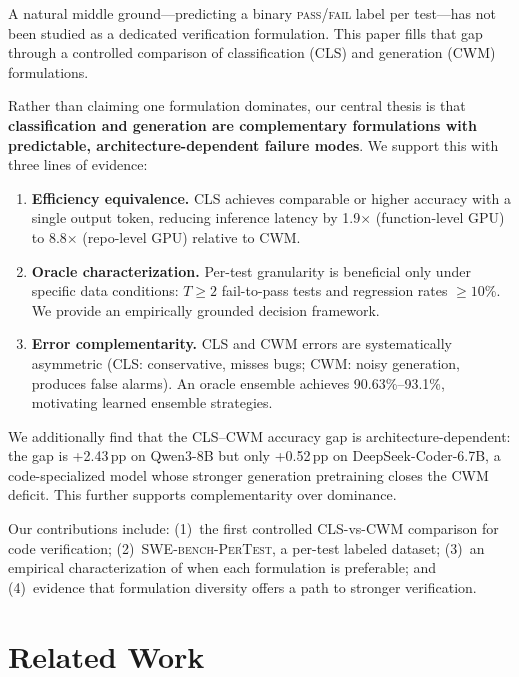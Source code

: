 \documentclass[11pt,a4paper]{article}
\begin{document}
A natural middle ground---predicting a binary \textsc{pass}/\textsc{fail} label per test---has not been studied as a dedicated verification formulation.
This paper fills that gap through a controlled comparison of classification (CLS) and generation (CWM) formulations.

Rather than claiming one formulation dominates, our central thesis is that \textbf{classification and generation are complementary formulations with predictable, architecture-dependent failure modes}.
We support this with three lines of evidence:

\begin{enumerate}
\item \textbf{Efficiency equivalence.}  CLS achieves comparable or higher accuracy with a single output token, reducing inference latency by 1.9$\times$ (function-level GPU) to 8.8$\times$ (repo-level GPU) relative to CWM.

\item \textbf{Oracle characterization.}  Per-test granularity is beneficial only under specific data conditions: $T\!\ge\!2$ fail-to-pass tests and regression rates $\ge\!10$\%.  We provide an empirically grounded decision framework.

\item \textbf{Error complementarity.}  CLS and CWM errors are systematically asymmetric (CLS: conservative, misses bugs; CWM: noisy generation, produces false alarms).  An oracle ensemble achieves 90.63\%--93.1\%, motivating learned ensemble strategies.
\end{enumerate}

We additionally find that the CLS--CWM accuracy gap is architecture-dependent: the gap is +2.43\,pp on Qwen3-8B but only +0.52\,pp on DeepSeek-Coder-6.7B, a code-specialized model whose stronger generation pretraining closes the CWM deficit.
This further supports complementarity over dominance.

Our contributions include: (1)~the first controlled CLS-vs-CWM comparison for code verification; (2)~\textsc{SWE-bench-PerTest}, a per-test labeled dataset; (3)~an empirical characterization of when each formulation is preferable; and (4)~evidence that formulation diversity offers a path to stronger verification.

\section{Related Work}
\end{document}
